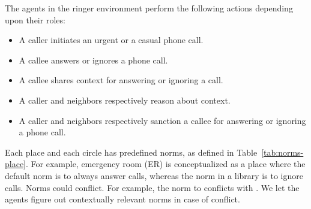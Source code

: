 The agents in the ringer environment perform the following actions depending upon their roles:
\begin{itemize}
\item A caller initiates an urgent or a casual phone call.
\item A callee answers or ignores a phone call.
\item A callee shares context for answering or ignoring a call.
\item A caller and neighbors respectively reason about context.
\item A caller and neighbors respectively sanction a callee for answering or ignoring a phone call.
\end{itemize}

Each place and each circle has predefined norms, as defined in Table~\ref{tab:norms-place}. For example, emergency room (ER) is conceptualized as a place where the default norm is to always answer calls, whereas the norm in a library is to ignore calls. Norms could conflict. For example, the norm to  conflicts with . We let the agents figure out contextually relevant norms in case of conflict. 

